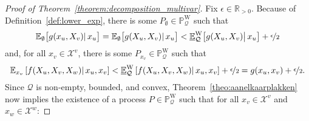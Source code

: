 \documentclass[10pt,a4paper]{paper}
\theoremstyle{definition}
\newcommand{\reals}{\mathbb{R}}
\newcommand{\realspos}{\reals_{>0}}
\newcommand{\states}{\mathcal{X}}
\newcommand{\processes}{\mathbb{P}}
\newcommand{\wprocesses}{\processes^{\mathrm{W}}}
\newcommand{\rateset}{\mathcal{Q}}
\newcommand{\norm}[1]{\left\lVert #1 \right\rVert}
\newcommand{\abs}[1]{\left\vert #1 \right\vert}
\newcommand{\coloneqq}{:\!=}
\begin{document}
\begin{proof}[Proof of Theorem~\ref{theorem:decomposition_multivar}]
Fix $\epsilon\in\realspos$.
Because of Definition~\ref{def:lower_exp}, there is some $P_\emptyset\in\wprocesses_\rateset$ such that
\begin{equation}\label{eq:theorem:decomposition_multivar:firsthalfprob}
\mathbb{E}_\emptyset\bigl[g(x_u,X_v)\vert\,x_u\bigr]
=\mathbb{E}_\emptyset\bigl[g(X_u,X_v)\vert\,x_u\bigr] < \underline{\mathbb{E}}^{\mathrm{W}}_\rateset\bigl[g(X_u,X_v)\big\vert\,x_u\bigr]
+\nicefrac{\epsilon}{2}
\end{equation}
and, for all $x_{v}\in\states^v$, there is some $P_{x_v}\in\wprocesses_\rateset$ such that
\begin{equation}\label{eq:theorem:decomposition_multivar:secondhalfprob}
\mathbb{E}_{x_v}\left[f(X_u,X_v,X_w)\vert\,x_u,x_v\right] < \underline{\mathbb{E}}^{\mathrm{W}}_\rateset\left[f(X_u,X_v,X_w)\vert\,x_u,x_v\right]+\nicefrac{\epsilon}{2}=g(x_u,x_v)+\nicefrac{\epsilon}{2}.
\end{equation}
Since $\rateset$ is non-empty, bounded, and convex, Theorem~\ref{theo:aanelkaarplakken} now implies the existence of a process $P\in\wprocesses_\rateset$ such that for all $x_v\in\states^v$ and $x_w\in\states^w$:

\end{proof}
\end{document}
